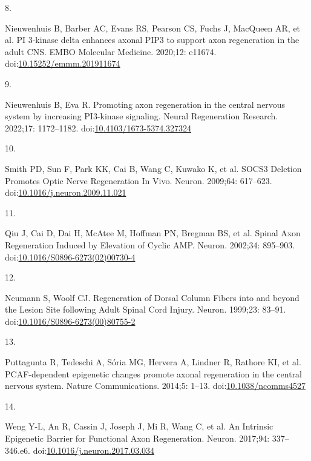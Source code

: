 \documentclass[
  12pt,
  a4paper,
]{book}
\newlength{\cslhangindent}
\newlength{\csllabelwidth}
\newlength{\cslentryspacingunit} %
\newenvironment{CSLReferences}[2] %
 {%
  \setlength{\parindent}{0pt}
  \ifodd #1
  \let\oldpar\par
  \def\par{\hangindent=\cslhangindent\oldpar}
  \fi
  \setlength{\parskip}{#2\cslentryspacingunit}
 }%
 {}
\newcommand{\CSLLeftMargin}[1]{\parbox[t]{\csllabelwidth}{#1}}
\newcommand{\CSLRightInline}[1]{\parbox[t]{\linewidth - \csllabelwidth}{#1}\break}
\begin{document}
\begin{CSLReferences}{0}{0}
\leavevmode{}%
\CSLLeftMargin{8. }%
\CSLRightInline{Nieuwenhuis B, Barber AC, Evans RS, Pearson CS, Fuchs J, MacQueen AR, et al. {PI} 3-kinase delta enhances axonal {PIP3} to support axon regeneration in the adult {CNS}. EMBO Molecular Medicine. 2020;12: e11674. doi:\href{https://doi.org/10.15252/emmm.201911674}{10.15252/emmm.201911674}}

\leavevmode{}%
\CSLLeftMargin{9. }%
\CSLRightInline{Nieuwenhuis B, Eva R. Promoting axon regeneration in the central nervous system by increasing {PI3-kinase} signaling. Neural Regeneration Research. 2022;17: 1172--1182. doi:\href{https://doi.org/10.4103/1673-5374.327324}{10.4103/1673-5374.327324}}

\leavevmode{}%
\CSLLeftMargin{10. }%
\CSLRightInline{Smith PD, Sun F, Park KK, Cai B, Wang C, Kuwako K, et al. {SOCS3 Deletion Promotes Optic Nerve Regeneration In Vivo}. Neuron. 2009;64: 617--623. doi:\href{https://doi.org/10.1016/j.neuron.2009.11.021}{10.1016/j.neuron.2009.11.021}}

\leavevmode{}%
\CSLLeftMargin{11. }%
\CSLRightInline{Qiu J, Cai D, Dai H, McAtee M, Hoffman PN, Bregman BS, et al. Spinal {Axon Regeneration Induced} by {Elevation} of {Cyclic AMP}. Neuron. 2002;34: 895--903. doi:\href{https://doi.org/10.1016/S0896-6273(02)00730-4}{10.1016/S0896-6273(02)00730-4}}

\leavevmode{}%
\CSLLeftMargin{12. }%
\CSLRightInline{Neumann S, Woolf CJ. Regeneration of {Dorsal Column Fibers} into and beyond the {Lesion Site} following {Adult Spinal Cord Injury}. Neuron. 1999;23: 83--91. doi:\href{https://doi.org/10.1016/S0896-6273(00)80755-2}{10.1016/S0896-6273(00)80755-2}}

\leavevmode{}%
\CSLLeftMargin{13. }%
\CSLRightInline{Puttagunta R, Tedeschi A, Sória MG, Hervera A, Lindner R, Rathore KI, et al. {PCAF-dependent} epigenetic changes promote axonal regeneration in the central nervous system. Nature Communications. 2014;5: 1--13. doi:\href{https://doi.org/10.1038/ncomms4527}{10.1038/ncomms4527}}

\leavevmode{}%
\CSLLeftMargin{14. }%
\CSLRightInline{Weng Y-L, An R, Cassin J, Joseph J, Mi R, Wang C, et al. An {Intrinsic Epigenetic Barrier} for {Functional Axon Regeneration}. Neuron. 2017;94: 337--346.e6. doi:\href{https://doi.org/10.1016/j.neuron.2017.03.034}{10.1016/j.neuron.2017.03.034}}


\end{CSLReferences}
\end{document}

